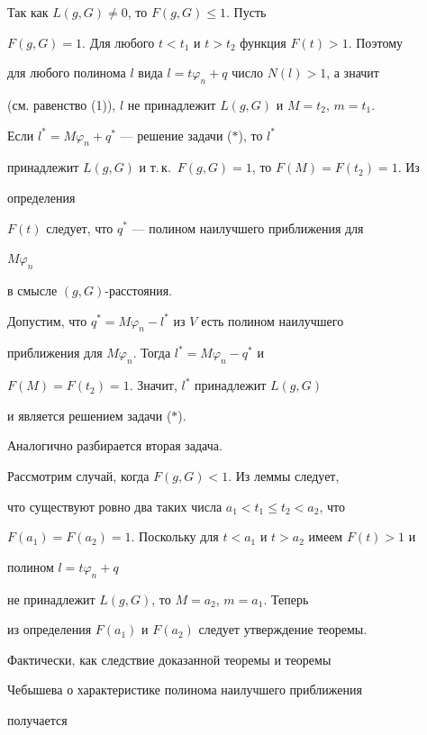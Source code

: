 \begin{pf} Так как $L(g,G)\ne 0$, то $F(g,G)\le 1$. Пусть 


$F(g,G)=1$. Для любого $t<t_1$ и $t>t_2$ функция $F(t)>1$. Поэтому 


для любого полинома $l$ вида $l=t\varphi_n+q$ число $N(l)>1$, а значит 


(см. равенство (1)), $l$ не принадлежит $L(g,G)$ и $M=t_2$, $m=t_1$. 


Если $l^*=M\varphi_n+q^*$ --- решение задачи ($*$), то $l^*$ 


принадлежит $L(g,G)$ и т.\,к.~$F(g,G)=1$, то $F(M)=F(t_2)=1$. Из 


определения 


$F(t)$ следует, что $q^*$ --- полином наилучшего приближения для 


$M\varphi_n$ 


в смысле $(g,G)$-расстояния. 


 


Допустим, что $q^*=M\varphi_n-l^*$ из $V$ есть полином наилучшего 


приближения для $M\varphi_n$. Тогда $l^*=M\varphi_n-q^*$ и 


$F(M)=F(t_2)=1$. Значит, $l^*$ принадлежит $L(g,G)$ 


и является решением задачи ($*$). 


Аналогично разбирается вторая задача. 


 


Рассмотрим случай, когда $F(g,G)<1$. Из леммы следует, 


что существуют ровно два таких числа $a_1<t_1\le t_2<a_2$, что 


$F(a_1)=F(a_2)=1$. Поскольку для $t<a_1$ и $t>a_2$ имеем $F(t)>1$ и 


полином $l=t\varphi_n+q$ 


не принадлежит $L(g,G)$, то $M=a_2$, $m=a_1$. Теперь 


из определения $F(a_1)$ и $F(a_2)$ следует утверждение теоремы.


\end{pf} 


 


Фактически, как следствие доказанной теоремы и теоремы 


Чебышева о характеристике полинома наилучшего приближения 


получается


